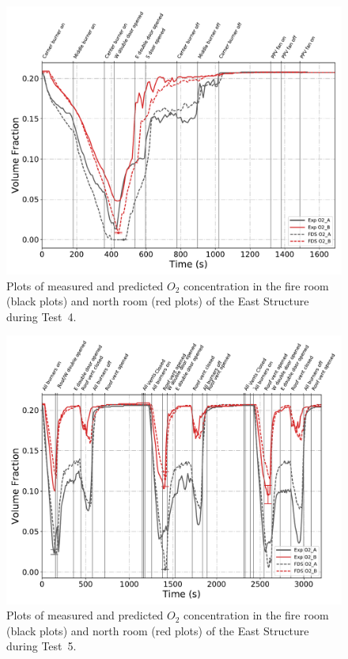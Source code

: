 \begin{figure}[!h]
	\centering
	\includegraphics[width=\columnwidth]{Figures/Plots/Validation/Gas_Concentration/Test_4_O2}
	\caption[Plots of measured and predicted $O_2$ concentration during Test~4.]{Plots of measured and predicted $O_2$ concentration in the fire room (black plots) and north room (red plots) of the East Structure during Test~4.}
	\label{fig:Test4_O2}
\end{figure}

\begin{figure}[!h]
	\centering
	\includegraphics[width=\columnwidth]{Figures/Plots/Validation/Gas_Concentration/Test_5_O2}
	\caption[Plots of measured and predicted $O_2$ concentration during Test~5.]{Plots of measured and predicted $O_2$ concentration in the fire room (black plots) and north room (red plots) of the East Structure during Test~5.}
	\label{fig:Test5_O2}
\end{figure}

